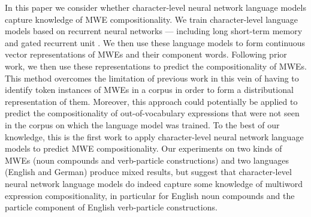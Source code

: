 \documentclass[11pt]{article}
\begin{document}

In this paper we consider whether character-level neural network
language models capture knowledge of MWE compositionality. We train
character-level language models based on recurrent neural networks ---
including long short-term memory \citep[LSTM,][]{hochreiter1997long}
and gated recurrent unit \citep[GRU,][]{cho2014learning}. We then use
these language models to form continuous vector representations of
MWEs and their component words. Following prior work, we then use
these representations to predict the compositionality of MWEs. This
method overcomes the limitation of previous work in this vein of
having to identify token instances of MWEs in a corpus in order to
form a distributional representation of them. Moreover, this approach
could potentially be applied to predict the compositionality of
out-of-vocabulary expressions that were not seen in the corpus on
which the language model was trained. To the best of our knowledge,
this is the first work to apply character-level neural network
language models to predict MWE compositionality. Our experiments on
two kinds of MWEs (noun compounds and verb-particle constructions) and
two languages (English and German) produce mixed results, but suggest
that character-level neural network language models do indeed capture
some knowledge of multiword expression compositionality, in particular
for English noun compounds and the particle component of English
verb-particle constructions.


\end{document}
